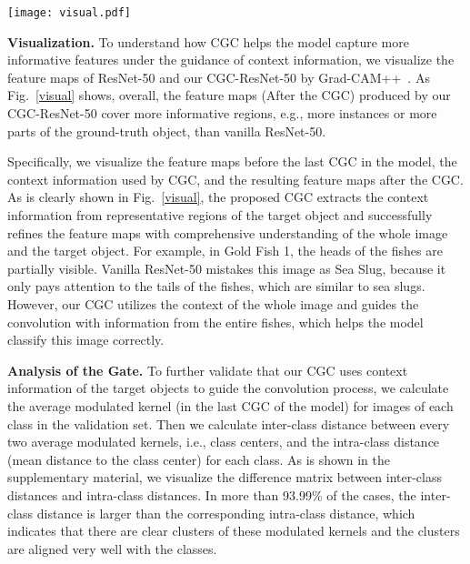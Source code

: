\documentclass[runningheads]{llncs}
\begin{document}
\begin{figure*}[t]

\begin{center}
\texttt{[image: visual.pdf]}
\end{center}
\caption{\label{visual}Visualization of the feature maps produced by ResNet-50 and CGC-ResNet-50 from the ImageNet validation set images. (Best viewed on a monitor when zoomed in.)}
\end{figure*}

\textbf{Visualization.}
To understand how CGC helps the model capture more informative features under the guidance of context information, we visualize the feature maps of ResNet-50 and our CGC-ResNet-50 by Grad-CAM++~\cite{chattopadhay2018grad}. As Fig.~\ref{visual} shows, overall, the feature maps (After the CGC) produced by our CGC-ResNet-50 cover more informative regions, e.g., more instances or more parts of the ground-truth object, than vanilla ResNet-50.



Specifically, we visualize the feature maps before the last CGC in the model, the context information used by CGC, and the resulting feature maps after the CGC. As is clearly shown in Fig.~\ref{visual}, the proposed CGC extracts the context information from representative regions of the target object and successfully refines the feature maps with comprehensive understanding of the whole image and the target object. For example, in Gold Fish 1, the heads of the fishes are partially visible. Vanilla ResNet-50 mistakes this image as Sea Slug, because it only pays attention to the tails of the fishes, which are similar to sea slugs. However, our CGC utilizes the context of the whole image and guides the convolution with information from the entire fishes, which helps the model classify this image correctly.

\textbf{Analysis of the Gate.}
To further validate that our CGC uses context information of the target objects to guide the convolution process, we calculate the average modulated kernel (in the last CGC of the model) for images of each class in the validation set. Then we calculate inter-class  distance between every two average modulated kernels, i.e., class centers, and the intra-class  distance (mean distance to the class center) for each class. As is shown in the supplementary material, we visualize the difference matrix between inter-class distances and intra-class distances. In more than 93.99\% of the cases, the inter-class distance is larger than the corresponding intra-class distance, which indicates that there are clear clusters of these modulated kernels and the clusters are aligned very well with the classes.
\end{document}

